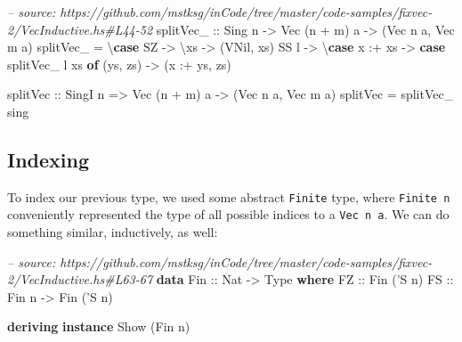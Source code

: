 \documentclass[]{article}
\newenvironment{Shaded}{}{}
\newcommand{\KeywordTok}[1]{\textcolor[rgb]{0.00,0.44,0.13}{\textbf{#1}}}
\newcommand{\DataTypeTok}[1]{\textcolor[rgb]{0.56,0.13,0.00}{#1}}
\newcommand{\CharTok}[1]{\textcolor[rgb]{0.25,0.44,0.63}{#1}}
\newcommand{\CommentTok}[1]{\textcolor[rgb]{0.38,0.63,0.69}{\textit{#1}}}
\newcommand{\OtherTok}[1]{\textcolor[rgb]{0.00,0.44,0.13}{#1}}
\newcommand{\FunctionTok}[1]{\textcolor[rgb]{0.02,0.16,0.49}{#1}}
\newcommand{\NormalTok}[1]{#1}
\begin{document}
\begin{Shaded}
\begin{Highlighting}[]
\CommentTok{-- source: https://github.com/mstksg/inCode/tree/master/code-samples/fixvec-2/VecInductive.hs#L44-52}
\OtherTok{splitVec_ ::} \DataTypeTok{Sing}\NormalTok{ n }\OtherTok{->} \DataTypeTok{Vec}\NormalTok{ (n }\FunctionTok{+}\NormalTok{ m) a }\OtherTok{->}\NormalTok{ (}\DataTypeTok{Vec}\NormalTok{ n a, }\DataTypeTok{Vec}\NormalTok{ m a)}
\NormalTok{splitVec_ }\FunctionTok{=}\NormalTok{ \textbackslash{}}\KeywordTok{case}
    \DataTypeTok{SZ}   \OtherTok{->}\NormalTok{ \textbackslash{}xs }\OtherTok{->}\NormalTok{ (}\DataTypeTok{VNil}\NormalTok{, xs)}
    \DataTypeTok{SS}\NormalTok{ l }\OtherTok{->}\NormalTok{ \textbackslash{}}\KeywordTok{case}
\NormalTok{      x }\FunctionTok{:+}\NormalTok{ xs }\OtherTok{->} \KeywordTok{case}\NormalTok{ splitVec_ l xs }\KeywordTok{of}
\NormalTok{        (ys, zs) }\OtherTok{->}\NormalTok{ (x }\FunctionTok{:+}\NormalTok{ ys, zs)}

\OtherTok{splitVec ::} \DataTypeTok{SingI}\NormalTok{ n }\OtherTok{=>} \DataTypeTok{Vec}\NormalTok{ (n }\FunctionTok{+}\NormalTok{ m) a }\OtherTok{->}\NormalTok{ (}\DataTypeTok{Vec}\NormalTok{ n a, }\DataTypeTok{Vec}\NormalTok{ m a)}
\NormalTok{splitVec }\FunctionTok{=}\NormalTok{ splitVec_ sing}
\end{Highlighting}
\end{Shaded}

\subsection{Indexing}\label{indexing-1}

To index our previous type, we used some abstract \texttt{Finite} type, where
\texttt{Finite\ n} conveniently represented the type of all possible indices to
a \texttt{Vec\ n\ a}. We can do something similar, inductively, as well:

\begin{Shaded}
\begin{Highlighting}[]
\CommentTok{-- source: https://github.com/mstksg/inCode/tree/master/code-samples/fixvec-2/VecInductive.hs#L63-67}
\KeywordTok{data} \DataTypeTok{Fin}\OtherTok{ ::} \DataTypeTok{Nat} \OtherTok{->} \DataTypeTok{Type} \KeywordTok{where}
    \DataTypeTok{FZ}\OtherTok{ ::} \DataTypeTok{Fin}\NormalTok{ (}\CharTok{'S n)}
    \DataTypeTok{FS}\OtherTok{ ::} \DataTypeTok{Fin}\NormalTok{ n }\OtherTok{->} \DataTypeTok{Fin}\NormalTok{ (}\CharTok{'S n)}

\KeywordTok{deriving} \KeywordTok{instance} \DataTypeTok{Show}\NormalTok{ (}\DataTypeTok{Fin}\NormalTok{ n)}
\end{Highlighting}
\end{Shaded}
\end{document}
